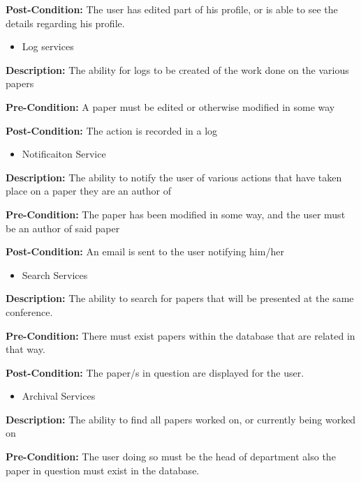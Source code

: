 \documentclass[11pt]{article}
\begin{document}
{\raggedright
	\textbf{Post-Condition: }The user has edited part of his profile, or is able to see the details regarding his profile.
}

\begin{itemize}
	\item Log services
\end{itemize}

{\raggedright
	\textbf{Description: }The ability for logs to be created of the work done on the various papers
}

{\raggedright
	\textbf{Pre-Condition: }A paper must be edited or otherwise modified in some way
}

{\raggedright
	\textbf{Post-Condition: }The action is recorded in a log
}

\begin{itemize}
	\item Notificaiton Service
\end{itemize}

{\raggedright
	\textbf{Description: }The ability to notify the user of various actions that have taken place on a paper they are an author of
}

{\raggedright
	\textbf{Pre-Condition: }The paper has been modified in some way, and the user must be an author of said paper
}

{\raggedright
	\textbf{Post-Condition: }An email is sent to the user notifying him/her
}

\begin{itemize}
	\item Search Services
\end{itemize}

{\raggedright
	\textbf{Description: }The ability to search for papers that will be presented at the same conference.
}

{\raggedright
	\textbf{Pre-Condition: }There must exist papers within the database that are related in that way.
}

{\raggedright
	\textbf{Post-Condition: }The paper/s in question are displayed for the user.
}

\begin{itemize}
	\item Archival Services
\end{itemize}

{\raggedright
	\textbf{Description: }The ability to find all papers worked on, or currently being worked on
}

{\raggedright
	\textbf{Pre-Condition: }The user doing so must be the head of department also the paper in question must exist in the database.
}
\end{document}
